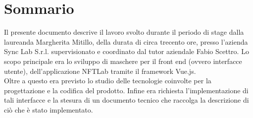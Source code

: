 
\cleardoublepage
{}
{}
\begingroup
\let\clearpage\relax
\let\cleardoublepage\relax
\let\cleardoublepage\relax

\chapter*{Sommario}

Il presente documento descrive il lavoro svolto durante il periodo di stage dalla laureanda Margherita Mitillo, della durata di circa trecento ore, presso l'azienda Sync Lab S.r.l. supervisionato e coordinato dal tutor aziendale Fabio Scettro.
Lo scopo principale era lo sviluppo di maschere per il front end (ovvero interfacce utente), dell'applicazione NFTLab tramite il framework Vue.js.\\
Oltre a questo era previsto lo studio delle tecnologie coinvolte per la progettazione e la codifica del prodotto.
Infine era richiesta l'implementazione di tali interfacce e la stesura di un documento tecnico che raccolga la descrizione di ciò che è stato implementato.

%
%

\endgroup			

\vfill

